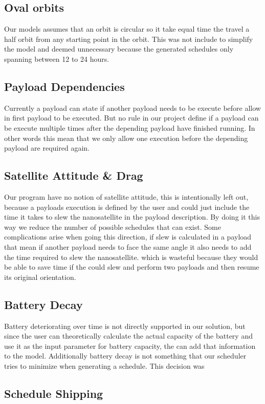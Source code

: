 \subsection*{Oval orbits}
Our models assumes that an orbit is circular so it take equal time the travel a half orbit from any starting point in the orbit. This was not include to simplify the model and deemed unnecessary because the generated schedules only spanning between 12 to 24 hours. 

\subsection*{Payload Dependencies}
Currently a payload can state if another payload needs to be execute before allow in first payload to be executed. But no rule in our project define if a payload can be execute multiple times after the depending payload have finished running. In other words this mean that we only allow one execution before the depending payload are required again.

\subsection*{Satellite Attitude \& Drag}
Our program have no notion of satellite attitude, this is intentionally left out, because a payloads execution is defined by the user and could just include the time it takes to slew the nanosatellite in the payload description. By doing it this way we reduce the number of possible schedules that can exist. Some complications arise when going this direction, if slew is calculated in a payload that mean if another payload needs to face the same angle it also needs to add the time required to slew the nanosatellite. which is wasteful because they would be able to save time if the could slew and perform two payloads and then resume its original orientation.

\subsection*{Battery Decay}
Battery deteriorating over time is not directly supported in our solution, but since the user can theoretically calculate the actual capacity of the battery and use it as the input parameter for battery capacity, the can add that information to the model. Additionally battery decay is not something that our scheduler tries to minimize when generating a schedule. This decision was

\subsection*{Schedule Shipping}
